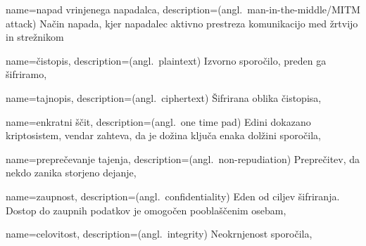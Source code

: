\documentclass[12pt,a4paper,openany,tikz]{book}
\theoremstyle{plain}
\theoremstyle{definition}
\begin{document}



{
  name={napad vrinjenega napadalca},
  description={(angl.\ man-in-the-middle/MITM attack) Način napada, kjer napadalec aktivno prestreza komunikacijo med žrtvijo in strežnikom}
}

{
  name=čistopis,
  description={(angl.\ plaintext) Izvorno sporočilo, preden ga šifriramo},
}

{
  name=tajnopis,
  description={(angl.\ ciphertext) Šifrirana oblika čistopisa},
}

{
  name=enkratni ščit,
  description={(angl.\ one time pad) Edini dokazano kriptosistem, vendar zahteva, da je dožina ključa enaka dolžini sporočila},
}

{
  name=preprečevanje tajenja,
  description={(angl.\ non-repudiation) Preprečitev, da nekdo zanika storjeno dejanje},
}

{
  name=zaupnost,
  description={(angl.\ confidentiality) Eden od ciljev šifriranja. Dostop do zaupnih podatkov je omogočen pooblaščenim osebam},
}

{
  name=celovitost,
  description={(angl.\ integrity) Neokrnjenost sporočila},
}
\end{document}
